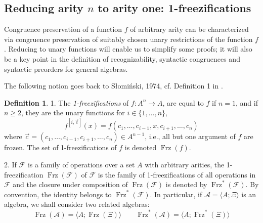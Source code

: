 \documentclass[11pt,a4paper]{article}
\theoremstyle{definition} %
\newtheorem{definition}[theorem]{Definition}
\newcommand\+[1]{\mathcal{#1}} %
\DeclareMathOperator{\freez}{Frz}%
\begin{document}
\subsection{Reducing arity $n$ to arity one:
1-freezifications}
\label{ss reducing to arity 1}

Congruence preservation of a function $f$ of arbitrary arity can be characterized via congruence preservation of suitably chosen unary restrictions of the function  $f$. 
Reducing to unary functions  will enable us to simplify some proofs; it will also be a key point in the definition of 
recognizability, syntactic congruences and syntactic preorders
for general algebras.

The following notion goes back to S\l{}omi\'nski, 1974,
cf. Definition 1 in \cite{Slominski74}.
%
\begin{definition}\label{not:freeze}
1.  The {\em 1-freezifications} of $f\colon A^{n}\to A$, are equal to $f$ if $n=1$, and if $n\geq2$, they are the  unary functions for $i\in\{1,\ldots,n\}$,
\begin{equation*}%
f^{[i,\vec{c}]}(x)=f(c_1,\ldots,c_{i-1},x,c_{i+1},\ldots,c_{n})
\end{equation*}
where  $\vec{c}=(c_1,\ldots,c_{i-1},c_{i+1},\ldots,c_n)\in A^{n-1}$,
i.e., all but one argument of $f$ are frozen. 
The set of 1-freezifications of $f$ is denoted $\freez(f)$.

2. If $\+F$ is a family of operations over a set $A$ with arbitrary arities,
the 1-freezification $\freez(\+F)$ of $\+F$
is the family of 1-freezifications of all operations in $\+F$
and 
the closure under composition
of $\freez(\+F)$ is denoted by $\freez^{*}(\+F)$.  By convention, the identity belongs to $\freez^{*}(\+F)$.
In particular, if $\+A=\langle A;\Xi\rangle$ is an algebra,
we shall consider two related algebras:  %
\begin{equation}\label{def:gen}
\freez(\+A)= \langle A;\freez(\Xi)\rangle
\qquad
\freez^{*}(\+A)= \langle A;\freez^{*}(\Xi)\rangle
\end{equation}
\end{definition}
%
\end{document}
